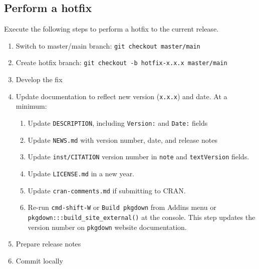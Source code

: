 \documentclass{article}
\begin{document}
\subsection{Perform a hotfix}
\label{sec:hotfix}

Execute the following steps to perform a hotfix to the current release.

\begin{enumerate}

  \item Switch to master/main branch: \texttt{git checkout master/main}

  \item Create hotfix branch: \texttt{git checkout -b hotfix-x.x.x master/main}

  \item Develop the fix

  \item Update documentation to reflect new version (\texttt{x.x.x}) and date.
        At a minimum:
  \begin{enumerate}

    \item Update \texttt{DESCRIPTION}, including \texttt{Version:} and \texttt{Date:} fields

    \item Update \texttt{NEWS.md} with version number, date, and release notes

	\item Update \texttt{inst/CITATION} version number
	      in \texttt{note} and \texttt{textVersion} fields.

    \item Update \texttt{LICENSE.md} in a new year.

    \item Update \texttt{cran-comments.md} if submitting to CRAN.

	\item Re-run \texttt{cmd-shift-W} or \texttt{Build pkgdown} from Addins menu or \\
		  \verb#pkgdown:::build_site_external()# at the console.
		  This step updates the version number on \texttt{pkgdown} website documentation.

  \end{enumerate}
  \item Prepare release notes

  \item Commit locally


\end{enumerate}
\end{document}
